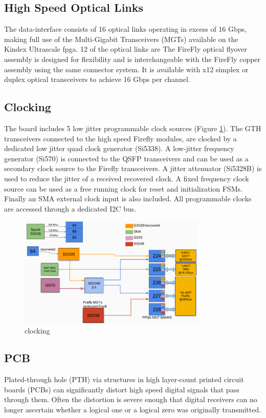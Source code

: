 \documentclass[a4paper]{PoS}
\begin{document}
\subsection{High Speed Optical Links}
The data-interface consists of 16 optical links operating in excess of 16 Gbps, making full use of the Multi-Gigabit Transceivers (MGTs) available on the Kindex Ultrascale fpga. 12 of the optical links are  
The FireFly optical flyover assembly is designed for flexibility and is interchangeable with the FireFly copper assembly using the same connector system. It is available with x12 simplex or duplex optical transceivers to achieve 16 Gbps per channel.


\subsection{Clocking}
The board includes 5 low jitter programmable clock sources (Figure \ref{clocking}). The GTH transceivers connected to the high speed Firefly modules, are clocked by a dedicated low jitter quad clock generator (Si5338). A low-jitter frequency generator (Si570) is connected to the QSFP transceivers and can be used as a secondary clock source to the Firefly transceivers. A jitter attenuator (Si5328B) is used to reduce the jitter of a received recovered clock. A fixed frequency clock source can be used as a free running clock for reset and initialization FSMs. Finally an SMA external clock input is also included. All programmable clocks are accessed through a dedicated I2C bus.

\begin{figure}[h]
\centering
\includegraphics[width=0.8\textwidth]{clocking.png}
\caption{clocking}
\label{clocking}
\end{figure}


\subsection{PCB}
Plated-through hole (PTH) via structures in high layer-count printed circuit boards (PCBs) can significantly distort high speed digital signals that pass through them. Often the  distortion is severe enough that digital receivers can no longer ascertain whether a  logical one or a logical zero was originally transmitted. 
\end{document}

